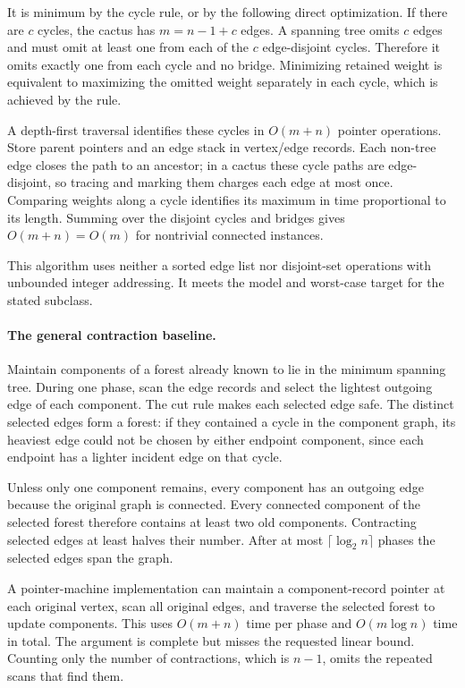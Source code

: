 \documentclass[11pt]{article}
\begin{document}
It is minimum by the cycle rule, or by the following direct optimization. If there are $c$ cycles, the cactus has $m=n-1+c$ edges. A spanning tree omits $c$ edges and must omit at least one from each of the $c$ edge-disjoint cycles. Therefore it omits exactly one from each cycle and no bridge. Minimizing retained weight is equivalent to maximizing the omitted weight separately in each cycle, which is achieved by the rule.

A depth-first traversal identifies these cycles in $O(m+n)$ pointer operations. Store parent pointers and an edge stack in vertex/edge records. Each non-tree edge closes the path to an ancestor; in a cactus these cycle paths are edge-disjoint, so tracing and marking them charges each edge at most once. Comparing weights along a cycle identifies its maximum in time proportional to its length. Summing over the disjoint cycles and bridges gives $O(m+n)=O(m)$ for nontrivial connected instances.

This algorithm uses neither a sorted edge list nor disjoint-set operations with unbounded integer addressing. It meets the model and worst-case target for the stated subclass.

\paragraph{The general contraction baseline.}
Maintain components of a forest already known to lie in the minimum spanning tree. During one phase, scan the edge records and select the lightest outgoing edge of each component. The cut rule makes each selected edge safe. The distinct selected edges form a forest: if they contained a cycle in the component graph, its heaviest edge could not be chosen by either endpoint component, since each endpoint has a lighter incident edge on that cycle.

Unless only one component remains, every component has an outgoing edge because the original graph is connected. Every connected component of the selected forest therefore contains at least two old components. Contracting selected edges at least halves their number. After at most $\lceil\log_2 n\rceil$ phases the selected edges span the graph.

A pointer-machine implementation can maintain a component-record pointer at each original vertex, scan all original edges, and traverse the selected forest to update components. This uses $O(m+n)$ time per phase and $O(m\log n)$ time in total. The argument is complete but misses the requested linear bound. Counting only the number of contractions, which is $n-1$, omits the repeated scans that find them.
\end{document}
